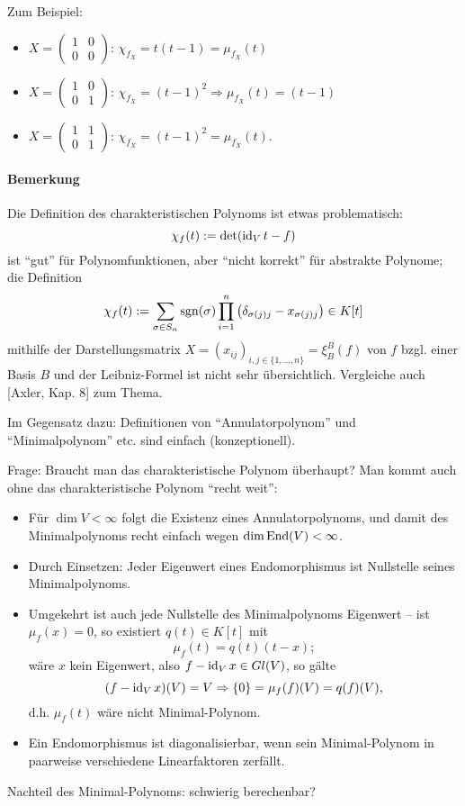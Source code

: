 	Zum Beispiel: 
		\begin{itemize}
			\item $ X = \begin{pmatrix}
			1&0\\0&0
			\end{pmatrix} $: $ \chi_{f_X} = t(t-1) = \mu_{f_X}(t)$
			\item $ X = \begin{pmatrix}
			1&0\\0&1
			\end{pmatrix} $: $ \chi_{f_X} = (t-1)^2 \Rightarrow \mu_{f_X}(t) = (t-1) $
			\item $ X = \begin{pmatrix}
			1&1\\0&1
			\end{pmatrix} $: $ \chi_{f_X} = (t-1)^2 = \mu_{f_X}(t)$.
		\end{itemize}

\paragraph{Bemerkung}
	Die Definition des charakteristischen Polynoms ist etwas problematisch:
		\[ \chi_f(t) := \det (\operatorname{id}_Vt-f) \]
	ist "`gut"' für Polynomfunktionen, aber "`nicht korrekt"' für abstrakte Polynome; die Definition 
		\[ \chi_f(t) := \sum_{\sigma\in S_n}\operatorname{sgn}(\sigma)\prod_{i=1}^{n}\left(\delta_{\sigma(j)j}-x_{\sigma(j)j} \right)\in K[t] \]
	mithilfe der Darstellungsmatrix $ X = (x_{ij})_{i,j\in \{1,\dots,n\}} = \xi_B^B(f) $
	von $ f $ bzgl. einer Basis $ B $ und der Leibniz-Formel ist nicht sehr übersichtlich. Vergleiche auch [Axler, Kap. 8] zum Thema.
	
	Im Gegensatz dazu: Definitionen von "`Annulatorpolynom"' und "`Minimalpolynom"' etc. sind einfach (konzeptionell).
	
	Frage: Braucht man das charakteristische Polynom überhaupt?
	Man kommt auch ohne das charakteristische Polynom "`recht weit"':
		\begin{itemize}
			\item Für $ \dim V <\infty $ folgt die Existenz eines Annulatorpolynoms, und damit des Minimalpolynoms recht einfach wegen $ \dim \operatorname{End}(V) <\infty $.
			\item Durch Einsetzen: Jeder Eigenwert eines Endomorphismus ist Nullstelle seines Minimalpolynoms.
			\item Umgekehrt ist auch jede Nullstelle des Minimalpolynoms Eigenwert -- ist $ \mu_f(x) = 0 $, so existiert $ q(t)\in K[t] $ mit
				\[ \mu_f(t) = q(t)(t-x); \]
			wäre $ x $ kein Eigenwert, also $ f-\operatorname{id}_V x \in Gl(V) $, so gälte
				\[ (f-\operatorname{id}_Vx)(V) = V \Rightarrow \{0\} = \mu_f(f)(V) = q(f)(V), \]
			d.h. $ \mu_f(t) $ wäre nicht Minimal-Polynom.
			\item Ein Endomorphismus ist diagonalisierbar, wenn sein Minimal-Polynom in paarweise verschiedene Linearfaktoren zerfällt.
		\end{itemize}
	
	Nachteil des Minimal-Polynoms: schwierig berechenbar?